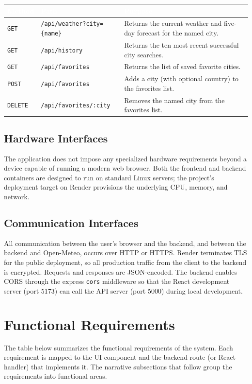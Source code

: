 \documentclass[11pt,letterpaper]{article}
\newcommand{\thead}[1]{\textcolor{white}{\bfseries #1}}
\begin{document}
\begin{tabularx}{\linewidth}{| C{0.7in} | L{1.9in} | Y |}
\hline
{}\thead{Method} & \thead{Path} & \thead{Purpose} \\
\hline
\texttt{GET}    & \texttt{/api/weather?city=\{name\}} & Returns the current weather and five-day forecast for the named city. \\ \hline
{}\texttt{GET}    & \texttt{/api/history}             & Returns the ten most recent successful city searches. \\ \hline
\texttt{GET}    & \texttt{/api/favorites}           & Returns the list of saved favorite cities. \\ \hline
{}\texttt{POST}   & \texttt{/api/favorites}           & Adds a city (with optional country) to the favorites list. \\ \hline
\texttt{DELETE} & \texttt{/api/favorites/:city}     & Removes the named city from the favorites list. \\ \hline
\end{tabularx}

\subsection{Hardware Interfaces}
The application does not impose any specialized hardware requirements beyond a device capable of running a modern web browser. Both the frontend and backend containers are designed to run on standard Linux servers; the project's deployment target on Render provisions the underlying CPU, memory, and network.

\subsection{Communication Interfaces}
All communication between the user's browser and the backend, and between the backend and Open-Meteo, occurs over HTTP or HTTPS. Render terminates TLS for the public deployment, so all production traffic from the client to the backend is encrypted. Requests and responses are JSON-encoded. The backend enables CORS through the express \texttt{cors} middleware so that the React development server (port 5173) can call the API server (port 5000) during local development.

\section{Functional Requirements}
The table below summarizes the functional requirements of the system. Each requirement is mapped to the UI component and the backend route (or React handler) that implements it. The narrative subsections that follow group the requirements into functional areas.
\end{document}
